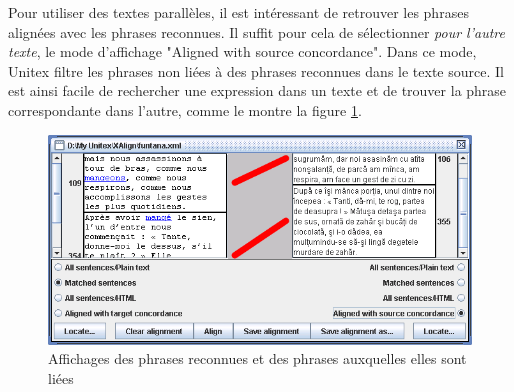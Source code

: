 \bigskip
\noindent Pour utiliser des textes parallèles, il est intéressant de retrouver les phrases alignées
avec les phrases reconnues. Il suffit pour cela de sélectionner 
\textit{pour l'autre texte}, le mode d'affichage "Aligned with source
concordance". Dans ce mode, Unitex filtre les phrases non liées à des phrases reconnues
dans le texte source. Il est ainsi facile de rechercher une
expression dans un texte et de trouver la phrase correspondante dans l'autre,
comme le montre la figure \ref{fig-x-concord-aligned}.

\begin{figure}[!ht]
\begin{center}
\includegraphics[width=15.5cm]{resources/img/figX-9.png}
\caption{Affichages des phrases reconnues et des phrases auxquelles elles sont liées
\label{fig-x-concord-aligned}}
\end{center}
\end{figure}
